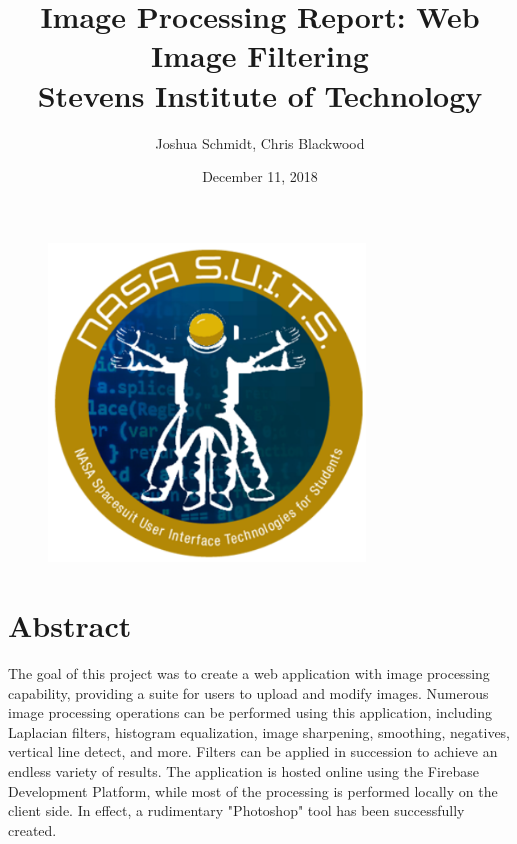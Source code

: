 \documentclass{article}
\title{%
    Image Processing Report: Web Image Filtering \\
    \large Stevens Institute of Technology}
\date{December 11, 2018}
\author{Joshua Schmidt, Chris Blackwood}
\let\Oldsection\section
\renewcommand{\section}{\FloatBarrier\Oldsection}
\begin{document}
  \maketitle

  \bigskip
  \bigskip
  \bigskip
  \bigskip

  \begin{figure}[!htb]
    \centering
    \includegraphics[width=0.75\textwidth]{assets/logo.png}
    \label{fig:logo}
  \end{figure}

  \newpage

  \tableofcontents

  \newpage


  \section{Abstract}

  The goal of this project was to create a web application with image processing capability, providing a suite for users to upload and modify images. Numerous image processing operations can be performed using this application, including Laplacian filters, histogram equalization, image sharpening, smoothing, negatives, vertical line detect, and more. Filters can be applied in succession to achieve an endless variety of results. The application is hosted online using the Firebase Development Platform, while most of the processing is performed locally on the client side. In effect, a rudimentary "Photoshop" tool has been successfully created.
  
\end{document}

